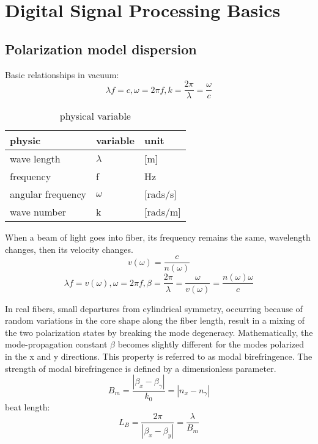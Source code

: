 \section{Digital Signal Processing Basics}

\subsection{Polarization model dispersion}
Basic relationships in vacuum:
\begin{equation}
\lambda f = c, \omega = 2\pi f, k = \frac{2\pi}{\lambda} = \frac{\omega}{c}
\end{equation}
\begin{table}[htbp]
    \centering
    \begin{tabular}{lll}
    physic        & variable  & unit \\
    \hline
    wave length   & $\lambda$ &  [m]  \\
    \hline
    frequency    &  f         & Hz \\ 
    \hline
    angular frequency & $\omega$ & [rads/s] \\
    \hline
    wave number    &   k        &  [rads/m] \\
    \hline
    \end{tabular}
    \caption{physical variable}
    \label{physical variable}
\end{table}
When a beam of light goes into fiber, its frequency remains the same, wavelength changes, then its velocity 
changes.
$$
v(\omega) = \frac{c}{n(\omega)}
$$
\begin{equation}
\lambda f = v(\omega), \omega = 2\pi f, \beta = \frac{2\pi}{\lambda} = \frac{\omega}{v(\omega)} = \frac{n(\omega)\omega}{c}
\end{equation}

In real fibers, small departures from cylindrical symmetry, 
occurring because of random variations in the core shape along the fiber length, 
result in a mixing of the two polarization states by breaking the mode degeneracy.
Mathematically, the mode-propagation constant $\beta$ becomes slightly different for the modes polarized in the x and
y directions.  This property is referred to as modal birefringence.  The strength of modal
birefringence is defined by a dimensionless parameter.
$$
B_{m}=\frac{\left|\beta_{x}-\beta_{\gamma}\right|}{k_{0}}=\left|n_{x}-n_{\gamma}\right|
$$
beat length:
$$
L_{B}=\frac{2 \pi}{\left|\beta_{x}-\beta_{y}\right|}=\frac{\lambda}{B_{m}}
$$


